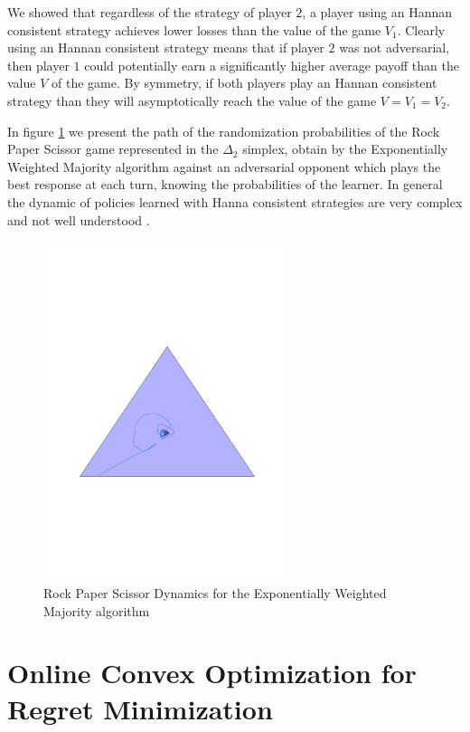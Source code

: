 We showed that regardless of the strategy of player $2$, a player using an Hannan consistent strategy achieves lower losses than the value of the game $V_1$. Clearly using an Hannan consistent strategy means that if player $2$ was not adversarial, then player $1$ could potentially earn a significantly higher average payoff than the value $V$ of the game. By symmetry, if both players play an Hannan consistent strategy than they will asymptotically reach the value of the game $V=V_1=V_2$.

In figure \ref{fig:RPS} we present the path of the randomization probabilities of the Rock Paper Scissor game represented in the $\Delta_{2}$ simplex, obtain by the Exponentially Weighted Majority algorithm against an adversarial opponent which plays the best response at each turn, knowing the probabilities of the learner. 
In general the dynamic of policies learned with Hanna consistent strategies are very complex and not well understood \cite{bailey2018multiplicative}.

\begin{figure}[ht!]
    \centering
    \includegraphics[width=7cm]{./img/rps_ewm.pdf}
\caption{Rock Paper Scissor Dynamics for the Exponentially Weighted Majority algorithm}
\label{fig:RPS}
\end{figure}

\section{Online Convex Optimization for Regret Minimization}\label{sec:OCO}

